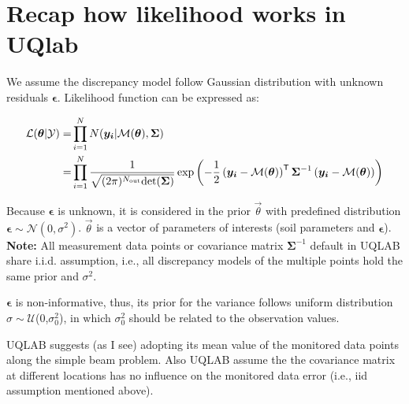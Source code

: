 \documentclass[12pt]{article}%
\theoremstyle{thmstyleone}%
\theoremstyle{thmstyletwo}%
\theoremstyle{thmstylethree}%
\begin{document}


\maketitle

\section{Recap how likelihood works in UQlab}\label{sec1}

We assume the discrepancy model follow Gaussian distribution with unknown residuals $\boldsymbol{\epsilon}$. Likelihood function can be expressed as:

\begin{equation}        
        \label{eq: Likelihood function}
        \begin{aligned}
         \mathcal{L}(\boldsymbol{\theta}|\mathcal{Y}) =& \prod_{i=1}^{N} N(\boldsymbol{y_{i}}|\mathcal{M}(\boldsymbol{\theta}),\boldsymbol{\Sigma}) \\
         =& \prod_{i=1}^{N}\frac{1}{\sqrt{(2 \pi)^{N_{\rm{out}}}{\rm{det}} 
         (\boldsymbol{\Sigma})}}\exp\left(-\frac{1}{2}\left(\boldsymbol{y_i} - \mathcal{M}(\boldsymbol{\theta})\right)^{\mathsf{T}} \boldsymbol{\Sigma}^{-1}\left(\boldsymbol{y_i} - \mathcal{M}(\boldsymbol{\theta})\right)\right) 
        \end{aligned}
        \end{equation}


Because $\boldsymbol{\epsilon}$ is unknown, it is considered in the prior $\vec\theta$ with predefined distribution $\boldsymbol{\epsilon} \sim \mathcal{N}(0,\sigma^2)$. $\vec\theta$ is a vector of parameters of interests (soil parameters and $\boldsymbol{\epsilon}$).\\


\textbf{Note:} All measurement data points or covariance matrix $\boldsymbol{\Sigma}^{-1}$ default in UQLAB share i.i.d. assumption, i.e., all discrepancy models of the multiple points hold the same prior and $\sigma^2$. 


$\boldsymbol{\epsilon}$ is non-informative, thus, its prior for the variance follows uniform distribution $\sigma\sim \mathcal{U}$(0,$\sigma_{0}^2$), in which $\sigma_{0}^2$ should be related to the observation values. 

UQLAB suggests (as I see) adopting its mean value of the monitored data points along the simple beam problem. Also UQLAB assume the  the covariance matrix at different locations has no influence on the monitored data error (i.e., iid assumption mentioned above).
\end{document}
